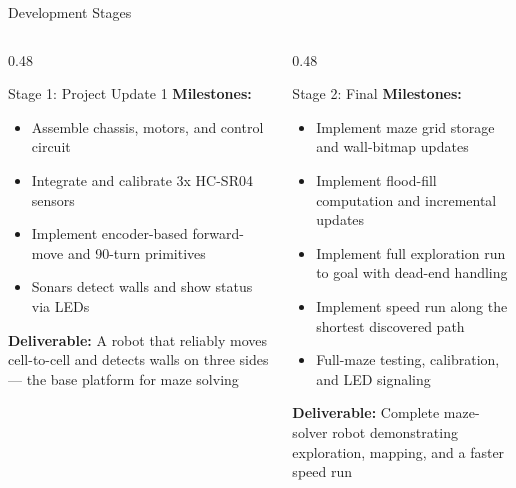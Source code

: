 \documentclass[aspectratio=169,11pt]{beamer}
\begin{document}
\begin{frame}{Development Stages}
    \scriptsize
    \begin{columns}[T]
        \begin{column}{0.48\textwidth}
            \begin{block}{Stage 1: Project Update 1}
                \textbf{Milestones:}
                \begin{itemize}\setlength{\itemsep}{0pt}
                    \item[$\square$] Assemble chassis, motors, and control circuit
                    \item[$\square$] Integrate and calibrate 3x HC-SR04 sensors
                    \item[$\square$] Implement encoder-based forward-move and 90\textdegree{}-turn primitives
                    \item[$\square$] Sonars detect walls and show status via LEDs
                \end{itemize}
                \textbf{Deliverable:} A robot that reliably moves cell-to-cell and detects walls on three sides --- the base platform for maze solving
            \end{block}
        \end{column}

        \begin{column}{0.48\textwidth}
            \begin{block}{Stage 2: Final}
                \textbf{Milestones:}
                \begin{itemize}\setlength{\itemsep}{0pt}
                    \item[$\square$] Implement maze grid storage and wall-bitmap updates
                    \item[$\square$] Implement flood-fill computation and incremental updates
                    \item[$\square$] Implement full exploration run to goal with dead-end handling
                    \item[$\square$] Implement speed run along the shortest discovered path
                    \item[$\square$] Full-maze testing, calibration, and LED signaling
                \end{itemize}
                \textbf{Deliverable:} Complete maze-solver robot demonstrating exploration, mapping, and a faster speed run
            \end{block}
        \end{column}
    \end{columns}
\end{frame}
\end{document}

